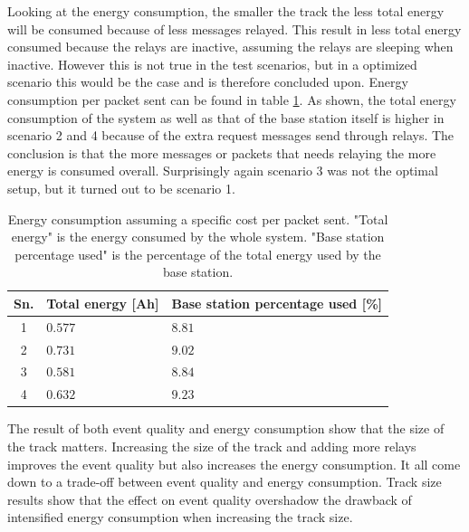 \noindent Looking at the energy consumption, the smaller the track the less total energy will be consumed because of less messages relayed. This result in less total energy consumed because the relays are inactive, assuming the relays are sleeping when inactive. However this is not true in the test scenarios, but in a optimized scenario this would be the case and is therefore concluded upon. Energy consumption per packet sent can be found in table \ref{table:energyConsumption}. As shown, the total energy consumption of the system as well as that of the base station itself is higher in scenario 2 and 4 because of the extra request messages send through relays. The conclusion is that the more messages or packets that needs relaying the more energy is consumed overall. Surprisingly again scenario 3 was not the optimal setup, but it turned out to be scenario 1.

\begin{table}[H]
	\centering
	\begin{tabularx}{\linewidth}{|c|X|X|}
		\hline
		Sn.	& Total energy [Ah]	& Base station percentage used [\%]	\\ \hline
		1			& $0.577$			& $8.81$							\\ \hline
		2			& $0.731$			& $9.02$							\\ \hline
		3			& $0.581$			& $8.84$							\\ \hline
		4			& $0.632$			& $9.23$							\\ \hline
	\end{tabularx}
	\caption{Energy consumption assuming a specific cost per packet sent. "Total energy" is the energy consumed by the whole system. "Base station percentage used" is the percentage of the total energy used by the base station.}
	\label{table:energyConsumption}
\end{table}

\noindent The result of both event quality and energy consumption show that the size of the track matters. Increasing the size of the track and adding more relays improves the event quality but also increases the energy consumption. It all come down to a trade-off between event quality and energy consumption. Track size results show that the effect on event quality overshadow the drawback of intensified energy consumption when increasing the track size.